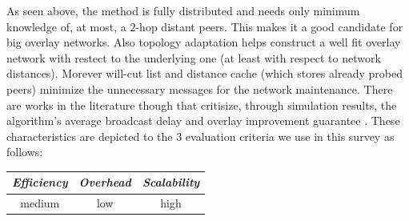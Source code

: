 %
%
%

As seen above, the method is fully distributed and needs only minimum knowledge
of, at most, a $2$-hop distant peers. This makes it a good candidate for big
overlay networks. Also topology adaptation helps construct a well fit overlay
network with restect to the underlying one (at least with respect to network
distances). Morever will-cut list and distance cache (which stores already
probed peers) minimize the unnecessary messages for the network maintenance.
There are works in the literature though that critisize, through simulation
results, the algorithm's average broadcast delay and overlay improvement
guarantee \cite{HLY2010}.
These characteristics are depicted to the $3$ evaluation criteria we use in this
survey as follows:

\begin{center}
{\footnotesize
\begin{tabular}{ccc}
\emph{Efficiency} & \emph{Overhead} & \emph{Scalability} \\
\hline
% 
medium &
low &
high
\end{tabular}
}
\end{center}

